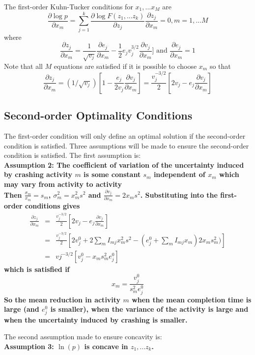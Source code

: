 \documentclass[11pt]{article}
\begin{document}
 The first-order Kuhn-Tucker conditions for $x_1,...x_M$ are
$$\frac{\partial \log p}{\partial x_m} = \sum_{j=1}^k \frac{\partial \log F(z_1,...z_k)}{\partial z_j} 
\frac{\partial z_j}{\partial x_m} =0  , m=1,...M $$
where
$$ \frac{\partial z_j}{\partial x_m} = \frac{1}{\sqrt{v_j}} \frac{\partial e_j}{\partial x_m}-  
\frac{1}{2} e_j v_j^{3/2} \frac{\partial v_j}{\partial x_m}]  \mbox{ and } \frac{\partial e_j}{\partial x_m}=1  $$
Note that all $M$ equations are satisfied if it is possible to choose $x_m$ so that
\begin{equation} 
\frac{\partial z_j}{\partial x_m} = (1/\sqrt{v_j}) [1 -   \frac{e_j}{2 v_j}  \frac{\partial v_j}{\partial x_m}] =
\frac{v_j^{-3/2}}{2}[2v_j - e_j \frac{\partial v_j}{\partial x_m}  ] 
 \label{firstorder}
\end{equation}
\subsection{Second-order Optimality Conditions}
The first-order condition will only define an optimal solution if the second-order condition is satisfied.
Three assumptions will be made to ensure the second-order condition is satisfied.  The first assumption is: \\
\bf Assumption 2: \rm The coefficient of variation of the uncertainty induced by crashing activity $m$ is some constant $s_m$ independent of $x_m$ which may vary from activity to activity \\ 
Then 
$\frac{\sigma_m}{x_m}=s_m$, $\sigma^2_m=x^2_m s^2$ and $\frac{\partial v_j}{\partial x_m} = 2 x_m s^2$.  Substituting into the first-order conditions gives
\begin{eqnarray*}
\frac{\partial z_j}{\partial x_m} &=& \frac{v_j^{-3/2}}{2}[2v_j - e_j \frac{\partial v_j}{\partial x_m}] \\ &=&
\frac{v_j^{-3/2}}{2}[2v^0_j + 2 \sum_m I_{mj} x^2_m s^2 -  (e^0_j + \sum_m I_{mj} x_m) 2 x_m s^2_m)]  \\
&=& v{j^{-3/2}} [v^0_j-x_m s^2_m e^0_j] 
\end{eqnarray*}
which is satisfied if 
$$ x_m =   \frac{ v^0_j}{s^2_m e^0_j}  $$
So the mean reduction in activity $m$ when the mean completion time is large (and $e^0_j$ is smaller), when the variance of the activity is large and when the uncertainty induced by crashing is smaller.   \par
The second assumption made to ensure concavity is:
\\ \bf Assumption 3: \rm  $\ln(p)$ is concave in $z_1,...z_k$. \\
\end{document}
